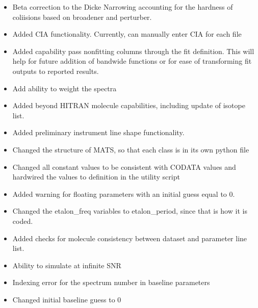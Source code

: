 \documentclass[letterpaper,10pt,english]{sphinxmanual}
\begin{document}
\sphinxAtStartPar
{}
\begin{itemize}
\item {} 
\sphinxAtStartPar
Beta correction to the Dicke Narrowing accounting for the hardness of coliisions based on broadener and perturber.

\item {} 
\sphinxAtStartPar
Added CIA functionality.  Currently, can manually enter CIA for each file

\item {} 
\sphinxAtStartPar
Added capability pass non\sphinxhyphen{}fitting columns through the fit definition.  This will help for future addition of bandwide functions or for ease of transforming fit outputs to reported results.

\item {} 
\sphinxAtStartPar
Add ability to weight the spectra

\item {} 
\sphinxAtStartPar
Added beyond HITRAN molecule capabilities, including update of isotope list.

\item {} 
\sphinxAtStartPar
Added preliminary instrument line shape functionality.

\end{itemize}

\sphinxAtStartPar
{}
\begin{itemize}
\item {} 
\sphinxAtStartPar
Changed the structure of MATS, so that each class is in its own python file

\item {} 
\sphinxAtStartPar
Changed all constant values to be consistent with CODATA values and hardwired the values to definition in the utility script

\item {} 
\sphinxAtStartPar
Added warning for floating parameters with an initial guess equal to 0.

\item {} 
\sphinxAtStartPar
Changed the etalon\_freq variables to etalon\_period, since that is how it is coded.

\item {} 
\sphinxAtStartPar
Added checks for molecule consistency between dataset and parameter line list.

\item {} 
\sphinxAtStartPar
Ability to simulate at infinite SNR

\item {} 
\sphinxAtStartPar
Indexing error for the spectrum number in baseline parameters

\item {} 
\sphinxAtStartPar
Changed initial baseline guess to 0

\end{itemize}
\end{document}
